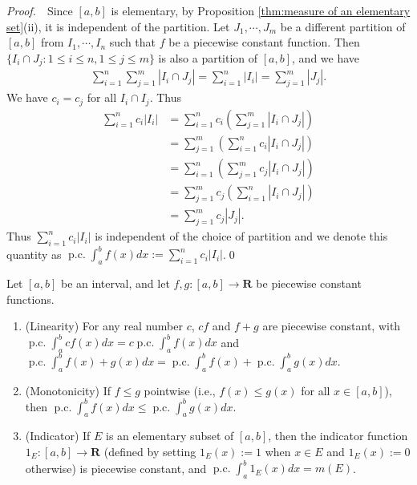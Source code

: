 \documentclass{book}
\theoremstyle{defstyle}
\theoremstyle{thmstyle}
\DeclareMathOperator{\PiecewiseConstant}{p.c.}
\newcommand{\pcint}{\PiecewiseConstant\int}
\newcommand{\pff}{\noindent\emph{Proof.}~~}
\newcounter{Proposition}[section]
\begin{document}
\pff Since $[a, b]$ is elementary, by Proposition \ref{thm:measure of an elementary set}(ii), it is independent of the partition. Let $J_1, \cdots, J_m$ be a different partition of $[a, b]$ from $I_1, \cdots, I_n$ such that $f$ be a piecewise constant function. Then $\{I_i \cap J_j : 1 \leq i \leq n, 1 \leq j \leq m\}$ is also a partition of $[a, b]$, and we have
    \begin{align*}
        \sum_{i = 1}^{n}\sum_{j = 1}^{m} |I_i \cap J_j| = \sum_{i = 1}^{n} |I_i| = \sum_{j = 1}^{m} |J_j|.
    \end{align*}
We have $c_i = c_j$ for all $I_i \cap I_j$. Thus
    \begin{align*}
        \sum_{i = 1}^{n} c_i|I_i|
        &= \sum_{i = 1}^{n} c_i \left(\sum_{j = 1}^{m}|I_i \cap J_j|\right)\\
        &= \sum_{j = 1}^{m}\left(\sum_{i = 1}^{n} c_i|I_i \cap J_j|\right)\\
        &= \sum_{i = 1}^{n}\left(\sum_{j = 1}^{m} c_j|I_i \cap J_j|\right)\\
        &= \sum_{j = 1}^{m} c_j \left(\sum_{i = 1}^{n}|I_i \cap J_j|\right)\\
        & = \sum_{j = 1}^{m} c_j|J_j|.
    \end{align*}
Thus $\sum_{i = 1}^{n} c_i|I_i|$ is independent of the choice of partition and we denote this quantity as $\pcint_{a}^{b}f(x)dx := \sum_{i = 1}^{n} c_i|I_i|$.\qed

\begin{theorem}\label{thm:basic properties of the piecewise constant integral}
    Let $[a, b]$ be an interval, and let $f, g : [a, b] \to \mathbf{R}$ be piecewise constant functions.
        \begin{enumerate}
            \item (Linearity) For any real number $c$, $cf$ and $f + g$ are piecewise constant, with $\pcint_{a}^{b}cf(x)dx = c\pcint_{a}^{b}f(x)dx$ and $\pcint_{a}^{b}f(x) + g(x) dx = \pcint_{a}^{b}f(x) + \pcint_{a}^{b}g(x)dx$.
            \item (Monotonicity) If $f \leq g$ pointwise (i.e., $f(x) \leq g(x)$ for all $x \in [a, b]$), then $\pcint_{a}^{b}f(x)dx \leq \pcint_{a}^{b}g(x)dx$.
            \item (Indicator) If $E$ is an elementary subset of $[a, b]$, then the indicator function $1_E : [a, b] \to \mathbf{R}$ (defined by setting $1_E(x) := 1$ when $x \in E$ and $1_E(x) := 0$ otherwise) is piecewise constant, and $\pcint_{a}^{b}1_E(x)dx = m(E)$.
        \end{enumerate}
\end{theorem}
\end{document}
